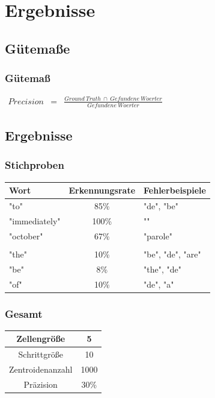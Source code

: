 \documentclass[9pt]{beamer}
\begin{document}
	\section{Ergebnisse}
		\subsection{Gütemaße}
			\begin{frame}
				\frametitle{Gütemaß}
				$
				\begin{array}{lcl}
					Precision & = & \frac{Ground\:Truth \:\cap\: Gefundene\:Woerter}{Gefundene\:Woerter}
				\end{array}
				$
				\\
				
			\end{frame}
			
		\subsection{Ergebnisse}
			\begin{frame}
				\frametitle{Stichproben}
				\begin{center}
					\begin{tabular}{|l|c|l|}
						\hline
						Wort & Erkennungsrate & Fehlerbeispiele\\
						\hline
						"to" & 85\% & "de", "be" \\
						\hline
						"immediately" & 100\% & ""\\
						\hline
						"october" & 67\% & "parole"\\
						\hline
						& & \\
						\hline
						"the" & 10\% & "be", "de", "are"\\
						\hline
						"be" & 8\% & "the", "de"\\
						\hline
						"of" & 10\% & "de", "a"\\
						\hline
					\end{tabular}
				\end{center}
			\end{frame}		
		
			\begin{frame}
				\frametitle{Gesamt}
				\begin{center}
					\begin{tabular}{|c|c|}
						\hline 
						Zellengröße & 5 \\ 
						\hline 
						Schrittgröße & 10 \\ 
						\hline 
						Zentroidenanzahl & 1000 \\ 
						\hline 
						Präzision & 30\% \\ 
						\hline 
					\end{tabular} 
				\end{center}
				
			\end{frame}
			
\end{document}
